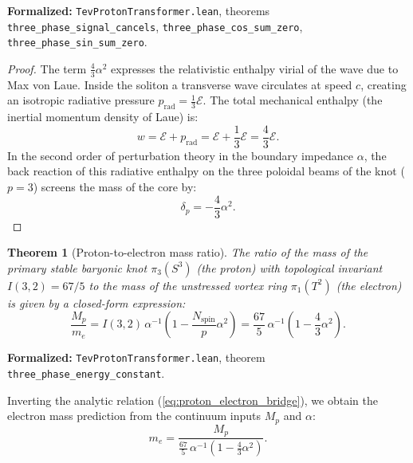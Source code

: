 \documentclass[11pt,a4paper]{article}
\newtheorem{theorem}{Theorem}
\theoremstyle{definition}
\theoremstyle{remark}
\begin{document}
\noindent\small\textbf{Formalized:} \texttt{TevProtonTransformer.lean}, theorems \texttt{three_phase_signal_cancels}, \texttt{three_phase_cos_sum_zero}, \texttt{three_phase_sin_sum_zero}.

\begin{proof}
The term $\frac{4}{3}\alpha^2$ expresses the relativistic enthalpy virial of the wave due to Max von Laue. Inside the soliton a transverse wave circulates at speed $c$, creating an isotropic radiative pressure $p_{\mathrm{rad}} = \frac{1}{3}\mathcal{E}$. The total mechanical enthalpy (the inertial momentum density of Laue) is:
\begin{equation}
    w = \mathcal{E} + p_{\mathrm{rad}} = \mathcal{E} + \frac{1}{3}\mathcal{E} = \frac{4}{3}\mathcal{E}.
    \label{eq:laue_enthalpy_exact}
\end{equation}
In the second order of perturbation theory in the boundary impedance $\alpha$, the back reaction of this radiative enthalpy on the three poloidal beams of the knot ($p=3$) screens the mass of the core by:
\begin{equation}
    \delta_p = -\frac{4}{3} \alpha^2.
\end{equation}
\end{proof}
	
\begin{theorem}[Proton-to-electron mass ratio]
	\label{thm:proton_electron_mass_ratio}
The ratio of the mass of the primary stable baryonic knot $\pi_3(S^3)$ (the proton) with topological invariant $I(3,2) = 67/5$ to the mass of the unstressed vortex ring $\pi_1(T^2)$ (the electron) is given by a closed-form expression:
\begin{equation}
	\frac{M_p}{m_e} = I(3, 2) \, \alpha^{-1} \left( 1 - \frac{N_{\mathrm{spin}}}{p}\alpha^2 \right) = \frac{67}{5} \, \alpha^{-1} \left( 1 - \frac{4}{3}\alpha^2 \right).
	\label{eq:proton_electron_bridge}
\end{equation}
\end{theorem}

\noindent\small\textbf{Formalized:} \texttt{TevProtonTransformer.lean}, theorem \texttt{three_phase_energy_constant}.
	
Inverting the analytic relation (\ref{eq:proton_electron_bridge}), we obtain the electron mass prediction from the continuum inputs $M_p$ and $\alpha$:
\begin{equation}
	m_e = \frac{M_p}{\frac{67}{5} \, \alpha^{-1} \left( 1 - \frac{4}{3}\alpha^2 \right)}.
	\label{eq:electron_mass_predicted}
\end{equation}
	
\end{document}
